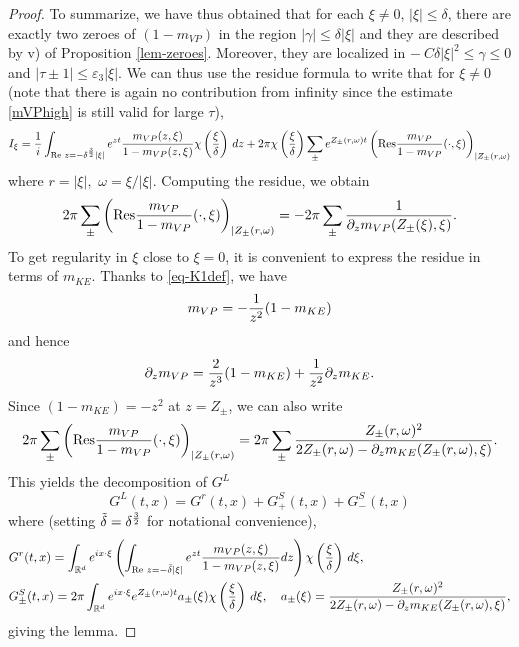 \documentclass[11pt]{amsart}
\numberwithin{equation}{section}
\newcommand{\eps}{\varepsilon}
\begin{document}
\begin{proof}
        
        To summarize, we have thus obtained that for each $\xi \neq 0$,   $|\xi| \leq \delta $, 
        there are exactly two zeroes of $(1-m_{VP})$ in the region
         $|\gamma | \leq \delta |\xi| $ and they are  described by v) of Proposition \ref{lem-zeroes}. Moreover, 
          they are localized in  $-\ C\delta | \xi |^2  \leq \gamma \leq 0$ and $ |\tau \pm 1 | \leq \eps_{3} | \xi|.$
          We can thus use the residue formula to write that for $\xi \neq 0$ (note that there is again no contribution from infinity
           since the estimate \eqref{mVPhigh} is still valid for large $\tau$),
     $$  I_{\xi}= {1 \over i } \int_{\operatorname{Re}\, z=- \delta^{3 \over 2} |\xi| }   e^{z t } { m_{VP}(z,\xi) \over 1-m_{VP}(z, \xi)}
   \chi\left({\xi \over \delta} \right) \, dz  +  2 \pi  \chi\left({\xi \over \delta} \right)  \sum_{\pm} e^{ Z_{\pm}(r, \omega) t}\left(\mbox{Res} { m_{VP} \over 1 - m_{VP}}(\cdot, \xi) \right)_{|Z_{\pm}(r, \omega)}$$
   where $r = |\xi|,$ $\omega = \xi/|\xi|$.       
 Computing the residue, we obtain
 $$ 2 \pi  \sum_{\pm}\left(\mbox{Res} { m_{VP} \over 1 - m_{VP}}(\cdot, \xi) \right)_{|Z_{\pm}(r, \omega)}
 =  - 2 \pi   \sum_{\pm}  { 1 \over \partial_{z} m_{VP}( Z_{\pm}(\xi), \xi)}.$$
    To get regularity in $\xi$ close to $\xi= 0$, it is convenient to express the residue in terms of $m_{KE}$. Thanks to \eqref{eq-K1def}, 
    we have
    $$ m_{VP}= - { 1 \over z^2} ( 1 - m_{KE})$$
    and hence
    $$ \partial_{z} m_{VP} = { 2 \over z^3}   ( 1 - m_{KE})  + { 1 \over z^2} \partial_{z} m_{KE}.$$
     Since $ ( 1 -m_{KE}) = - z^2$ at $z= Z_{\pm}$, we can also write
    $$ 2  \pi  \sum_{\pm}\left(\mbox{Res} { m_{VP} \over 1 - m_{VP}}(\cdot, \xi) \right)_{|Z_{\pm}(r, \omega)}
 =   2 \pi   \sum_{\pm}  { Z_{\pm}(r, \omega)^2 \over  2 Z_{\pm}(r, \omega) - \partial_{z}m_{KE}(Z_{\pm}(r, \omega), \xi)}.$$
 This yields the decomposition of $G^L$
 \begin{equation}
 \label{GLdec}
 G^L(t,x) = G^r(t,x)  + G^S_{+}(t,x) + G^S_{-}(t,x)
 \end{equation}
 where (setting $\tilde \delta = \delta^{3 \over 2}$ for notational convenience), 
 \begin{align*}
  & G^r(t,x) =   \int_{\mathbb{R}^d} e^{ix \cdot \xi} \left( \int_{\operatorname{Re}\, z=- \tilde \delta |\xi| }   e^{z t } { m_{VP}(z,\xi) \over 1-m_{VP}(z, \xi)}dz \right) \chi \left( { \xi \over \delta}  \right)  \, d\xi, \\
 & G^S_{\pm}(t,x) = 2\pi   \int_{\mathbb{R}^d} e^{ix \cdot \xi} e^{ Z_{\pm}(r, \omega) t}   a_{\pm}(\xi)  \chi \left( { \xi \over \delta} \right)  \, d\xi,
  \quad a_{\pm}(\xi)=  { Z_{\pm}(r, \omega)^2 \over  2 Z_{\pm}(r, \omega) - \partial_{z}m_{KE}(Z_{\pm}(r, \omega), \xi)},
 \end{align*}
giving the lemma.   \end{proof}
\end{document}
